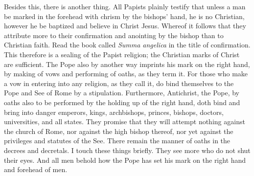 Besides this, there is another thing. All Papists plainly testify that unless a man be marked in the forehead with chrism by the bishops’ hand, he is no Christian, however he be baptized and believe in Christ Jesus. Whereof it follows that they attribute more to their confirmation and anointing by the bishop than to Christian faith. Read the book called \textit{Summa angelica} in the title of confirmation. This therefore is a sealing of the Papist religion; the Christian marks of Christ are sufficient. The Pope also by another way imprints his mark on the right hand, by making of vows and performing of oaths, as they term it. For those who make a vow in entering into any religion, as they call it, do bind themselves to the Pope and See of Rome by a stipulation. Furthermore, Antichrist, the Pope, by oaths also to be performed by the holding up of the right hand, doth bind and bring into danger emperors, kings, archbishops, princes, bishops, doctors, universities, and all states. They promise that they will attempt nothing against the church of Rome, nor against the high bishop thereof, nor yet against the privileges and statutes of the See. There remain the manner of oaths in the decrees and decretals. I touch these things briefly. They see more who do not shut their eyes. And all men behold how the Pope has set his mark on the right hand and forehead of men.

